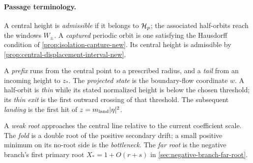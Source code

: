 \paragraph{Passage terminology.}
\label{tab:terminology}
A central height is \emph{admissible} if it belongs to \(\mathcal H_p\);
the associated half-orbits reach the windows \(W_\pm\).
A \emph{captured} periodic orbit is one satisfying the Hausdorff
condition of \cref{prop:isolation-capture-new}. Its central height
is admissible by \cref{prop:central-displacement-interval-new}.

A \emph{prefix} runs from the central point to a prescribed radius,
and a \emph{tail} from an incoming height to \(z_*\).
The \emph{projected state} is the boundary-flow coordinate \(w\).
A half-orbit is \emph{thin} while its stated normalized height is
below the chosen threshold; its \emph{thin exit} is the first outward
crossing of that threshold. The subsequent \emph{landing} is the first
hit of \(z=m_{\rm land}|\eta|^2\).

A \emph{weak root} approaches the central line relative to the current
coefficient scale. The \emph{fold} is a double root of the positive
secondary drift; a small positive minimum on its no-root side is the
\emph{bottleneck}. The \emph{far root} is the negative branch's first
primary root \(X_*=1+O(r+s)\) in
\cref{sec:negative-branch-far-root}.

